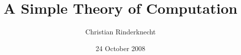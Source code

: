 
%
\usepackage[english]{babel}

%
\usepackage{graphicx}

%
\usepackage{multicol}

%
\usepackage{mathpartir}

%
\usepackage{clrscode}

%
\usepackage{amssymb,amsmath,stmaryrd}

%
\usepackage{url}
\usepackage{xspace,hyphenat}

%





%
\newcommand{\Ada}{\textsf{Ada}\xspace}
\newcommand{\Java}{\textsf{Java}\xspace}
\newcommand{\Maude}{\textsf{Maude}\xspace}
\newcommand{\C}{\textsf{C}\xspace}
\newcommand{\Csharp}{\textsf{C}\raise 0.7mm \hbox{\(\scriptscriptstyle \textsf{\#}\)}\xspace}
\newcommand{\Cpp}{\textsf{C}\raise 0.5mm \hbox{\(\scriptscriptstyle ++\)}\xspace}
\newcommand{\NaN}{\textsf{NaN}\xspace}
\newcommand{\true}{\textsf{true}\xspace}
\newcommand{\false}{\textsf{false}\xspace}

\newcommand\rname[1]{\langle{#1}\rangle}

%
\title{A Simple Theory of Computation}
\author{Christian Rinderknecht}
\date{24 October 2008}



\frame{\maketitle}




